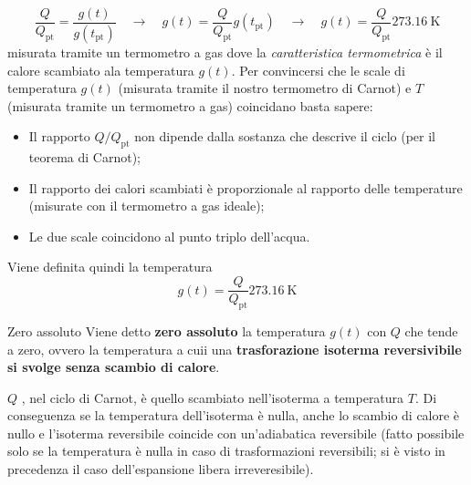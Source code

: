 \documentclass[x11names]{report}
\begin{document}
	\[ 
	\frac{Q}{Q_{\text{pt}}} = \frac{g(t)}{g(t_{\text{pt}})} \quad \to \quad g(t) =\frac{Q}{Q_{\text{pt}}}  g(t_{\text{pt}}) \quad \to \quad g(t) =\frac{Q}{Q_{\text{pt}}}\SI{ 273.16}{\kelvin}
	\]misurata tramite un termometro a gas
	dove la \textit{caratteristica termometrica} è il calore scambiato ala temperatura \(g(t)\). Per convincersi che le scale di temperatura \(g(t)\) (misurata tramite il nostro termometro di Carnot) e \(T\) (misurata tramite un termometro a gas) coincidano basta sapere:
	\begin{itemize}
		\item Il  rapporto \(Q/Q_{\text{pt}}\) non dipende dalla  sostanza che descrive il ciclo (per il teorema di Carnot);
		\item Il rapporto dei calori scambiati è proporzionale al rapporto delle temperature (misurate con il termometro a gas ideale);
		\item Le due scale coincidono al punto triplo dell'acqua.
	\end{itemize}
	Viene definita quindi la temperatura
	\[ 
	g(t) = \frac{Q}{Q_{\text{pt}}}\SI{ 273.16}{\kelvin}
	\]
	\begin{center}
		\colorbox{yblue}{\begin{minipage}{5.75in}
				\begin{blues}{Zero assoluto}
					Viene detto \textbf{zero assoluto} la temperatura \(g(t)\) con \(Q\) che tende a zero, ovvero la temperatura a cuii una \textbf{trasforazione isoterma reversivibile si svolge senza scambio di calore}.
				\end{blues}
		\end{minipage}}
	\end{center}
	
	\(Q\) , nel ciclo di Carnot, è quello scambiato nell'isoterma a temperatura \(T\). Di conseguenza se la temperatura dell'isoterma è nulla, anche lo scambio di calore è nullo e l'isoterma reversibile coincide con  un'adiabatica reversibile (fatto possibile solo se la temperatura è nulla in caso di trasformazioni reversibili; si è visto in precedenza il caso dell'espansione libera irreveresibile).
	
	\newpage
\end{document}
